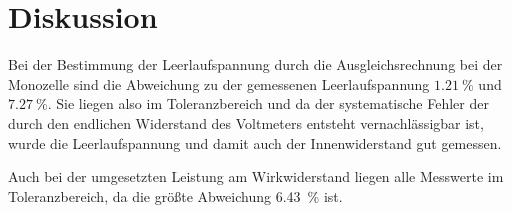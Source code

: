 \section{Diskussion}

Bei der Bestimmung der Leerlaufspannung durch die Ausgleichsrechnung bei der Monozelle
sind die Abweichung zu der gemessenen Leerlaufspannung $\SI{1.21}{\percent}$ und
$\SI{7.27}{\percent}$. Sie liegen also im Toleranzbereich und da der systematische
Fehler der durch den endlichen Widerstand des Voltmeters entsteht vernachlässigbar ist,
wurde die Leerlaufspannung und damit auch der Innenwiderstand gut gemessen.

Auch bei der umgesetzten Leistung am Wirkwiderstand liegen alle Messwerte im Toleranzbereich,
da die größte Abweichung \SI{6.43}{\percent} ist.
